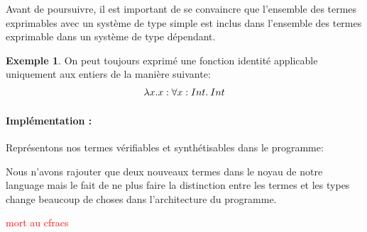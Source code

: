 \documentclass {article}
\newcommand{\codefrom}[3]
           {}
\theoremstyle{definition}
\newtheorem{example}{Exemple}
\theoremstyle{remark}
\newcommand{\todo}[1]{\textcolor{red}{#1}}
\begin{document}
Avant de poursuivre, il est important de se convaincre que l'ensemble des termes exprimables avec un système 
de type simple est inclus dans l'ensemble des termes exprimable dans un système de type dépendant.
\begin{example}
  On peut toujours exprimé une fonction identité applicable uniquement aux entiers de la manière suivante:
  \begin{align*}
    &\lambda x. x : \forall x:Int.\: Int \\
  \end{align*}
\end{example}

\paragraph{Implémentation :} 

Représentons nos termes vérifiables et synthétisables dans le programme:
\codefrom{dependent}{lambda}{inTm_head}
\codefrom{dependent}{lambda}{inTm}
\codefrom{dependent}{lambda}{exTm_head}
\codefrom{dependent}{lambda}{exTm}

Nous n'avons rajouter que deux nouveaux termes dans le noyau de notre language mais 
le fait de ne plus faire la distinction entre les termes et les types change beaucoup de
choses dans l'architecture du programme. 


\todo{mort au cfracs}
\end{document}
